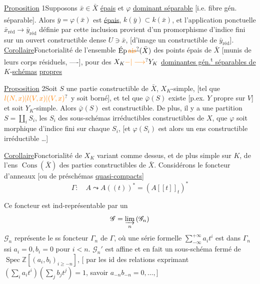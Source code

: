 \uline{Proposition} 1\quad Supposons $\bar x\in\bar X$ \uline{épais} et $\varphi$ \uline{dominant  séparable} [i.e. fibre gén. séparable]. Alors\textsuperscript{} $\bar y=\varphi(\bar x)$  est \uline{épais}, $k(\bar y)\subset{}k(\bar x)$, et l'application ponctuelle $\bar x_{\mathrm{réd}}\longrightarrow\bar y_{\mathrm{réd}}$ définie par cette inclusion provient d'un promorphisme d'indice fini sur un ouvert constructible dense $U\ni\bar x$, [d'image un  constructible de $\bar y_{\mathrm{réd}}$].
\uline{Corollaire}\quad Fonctorialité  de l'ensemble $\operatorname{\text{Ép}}\deleted{\unsure{\mathrm{ais}}}(\bar X)$ des points  épais de $\bar X$ [munis de leurs corps résiduels, ----], pour des  $X_K\unsure{\mathord{-}|\longrightarrow}Y_K$ \uline{dominantes gén.\textsuperscript{t} séparables de} $K$-\uline{schémas} \uline{propres}

\uline{Proposition} 2\quad Soit $S$ une partie constructible de $\bar X$, $X_K$-simple, [tel que $\unsure{l(N,x)|l(V,x)|(V,x)}$ y soit borné], et tel que $\bar\varphi(S)$ existe [p.ex. $Y$ propre sur $V$] et soit $Y_K$-simple. Alors $\bar\varphi(S)$ est constructible. De plus, il y a une partition  $S=\coprod_i S_i$, les $S_i$ des sous-schémas irréductibles constructibles de $X$,  que $\varphi$ soit morphique d'indice fini sur chaque $S_i$, [et $\varphi(S_i)$ est alors un ens constructible irréductible \ldots]

\uline{Corollaire}\quad Fonctorialité de $X_K$ variant comme dessus, et de plus simple sur $K$, de l'ens $\operatorname{Cons}(\bar X)$ des parties constructibles de $\bar X$.
Considérons le foncteur d'anneaux [ou de préschémas \uline{quasi-compacts}]
\[
\Gamma:\quad A\leadsto A((t))^{*}=(A[[t]]_{t})^{*}
\]

Ce foncteur est ind-représentable par un
\[
\mathscr G=\underset{n}{\varinjlim}\,(\mathscr G_n)
\]
$\mathscr G_n$ représente le ss foncteur $\Gamma_n$ de $\Gamma$, où une série formelle  $\sum_{-\infty}^{+\infty}a_i t^i$  est dans $\Gamma_n$ ssi $a_i=0,b_i=0$ pour $i<n$. $\mathscr G_n'$ est affine et en fait un sous-schéma fermé de $\operatorname{Spec}\mathbb Z[(a_i,b_i)_{i\geq-n}]$, [ par les  id des relations exprimant $(\sum_i a_i t^i)(\sum_j b_j t^j)=1$, savoir $a_{-n}b_{-n}=0,\ldots,$]

